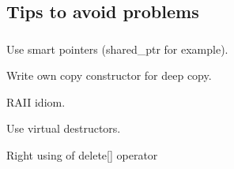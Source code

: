 \documentclass{bredelebeamer}
\begin{document}
%
%
%
%
%
%
%

\subsection{Tips to avoid problems}
\begin{frame}[fragile]
	\frametitle{}
	\begin{center}
		\begin{exampleblock}{}
			Use smart pointers (shared\_ptr for example).
		\end{exampleblock}
		\begin{exampleblock}{}
			Write own copy constructor for deep copy.
		\end{exampleblock}
		\begin{exampleblock}{}
			RAII idiom.
		\end{exampleblock}
		\begin{exampleblock}{}
			Use virtual destructors.
		\end{exampleblock}
		\begin{exampleblock}{}
		Right using of delete[] operator
		\end{exampleblock}
	\end{center}
\end{frame}
\end{document}
